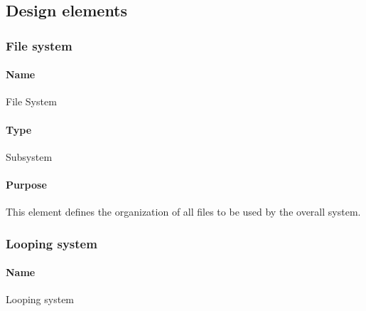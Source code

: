     
\subsection{Design elements}
    
    
    
    \subsubsection{File system}
        \paragraph{Name}    File System
        \paragraph{Type}    Subsystem
        \paragraph{Purpose} This element defines the organization of all files to be used by the overall system.

    \subsubsection{Looping system}
        \paragraph{Name}    Looping system
